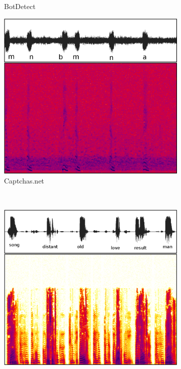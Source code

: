 \begin{figure}[tp]
\begin{subfigure}{0.3\textwidth}
        \caption{BotDetect}
        \label{fig:botdetect}
\end{subfigure}\hspace{0.03\textwidth}
\begin{subfigure}{0.3\textwidth}
        \includegraphics[width=\textwidth]{figures/captchas.pdf}
        \caption{Captchas.net}
        \label{fig:captchas}
\end{subfigure} \\
\begin{subfigure}{0.3\textwidth}
        \includegraphics[width=\textwidth]{figures/live.pdf}

\end{subfigure}
\end{figure}
